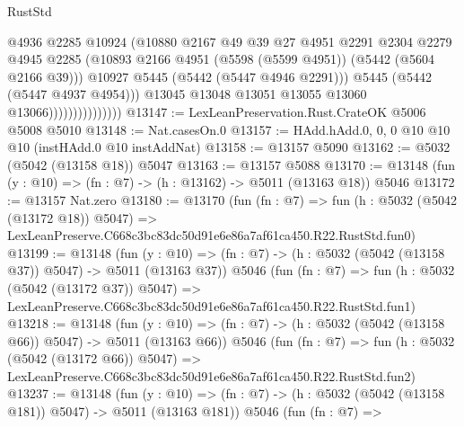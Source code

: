 \begin{lexlean}{RustStd}
\begin{coremodule}
                                    @4936
                                    @2285
                                    @10924
                                    (@10880
                                      @2167
                                      @49
                                      @39
                                      @27
                                      @4951
                                      @2291
                                      @2304
                                      @2279
                                      @4945
                                      @2285
                                      (@10893
                                        @2166
                                        @4951
                                        (@5598 (@5599 @4951))
                                        (@5442 (@5604 @2166 @39)))
                                      @10927
                                      @5445
                                      (@5442 (@5447 @4946 @2291)))
                                    @5445
                                    (@5442 (@5447 @4937 @4954)))
                                  @13045
                                  @13048
                                  @13051
                                  @13055
                                  @13060
                                  @13066)))))))))))))))
@13147 := LexLeanPreservation.Rust.CrateOK @5006 @5008 @5010
@13148 := Nat.casesOn.{0}
@13157 := HAdd.hAdd.{0, 0, 0} @10 @10 @10 (instHAdd.{0} @10 instAddNat)
@13158 := @13157 @5090
@13162 := @5032 (@5042 (@13158 @18)) @5047
@13163 := @13157 @5088
@13170 := @13148 (fun (y : @10) => (fn : @7) -> (h : @13162) -> @5011 (@13163 @18)) @5046
@13172 := @13157 Nat.zero
@13180 := @13170
    (fun (fn : @7) =>
    fun (h : @5032 (@5042 (@13172 @18)) @5047) =>
    LexLeanPreserve.C668c3bc83dc50d91e6e86a7af61ca450.R22.RustStd.fun0)
@13199 := @13148
    (fun (y : @10) => (fn : @7) -> (h : @5032 (@5042 (@13158 @37)) @5047) -> @5011 (@13163 @37))
    @5046
    (fun (fn : @7) =>
    fun (h : @5032 (@5042 (@13172 @37)) @5047) =>
    LexLeanPreserve.C668c3bc83dc50d91e6e86a7af61ca450.R22.RustStd.fun1)
@13218 := @13148
    (fun (y : @10) => (fn : @7) -> (h : @5032 (@5042 (@13158 @66)) @5047) -> @5011 (@13163 @66))
    @5046
    (fun (fn : @7) =>
    fun (h : @5032 (@5042 (@13172 @66)) @5047) =>
    LexLeanPreserve.C668c3bc83dc50d91e6e86a7af61ca450.R22.RustStd.fun2)
@13237 := @13148
    (fun (y : @10) => (fn : @7) -> (h : @5032 (@5042 (@13158 @181)) @5047) -> @5011 (@13163 @181))
    @5046
    (fun (fn : @7) =>

\end{coremodule}
\end{lexlean}
